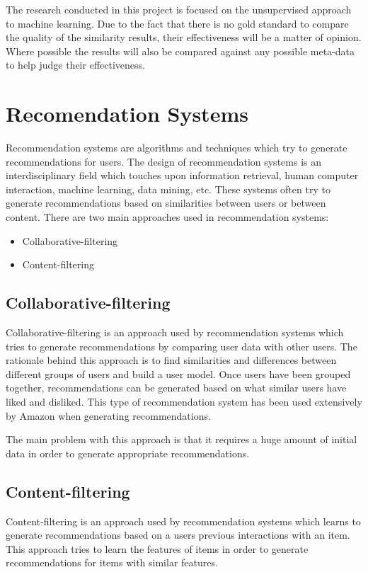 The research conducted in this project is focused on the unsupervised approach to machine learning.
Due to the fact that there is no gold standard to compare the quality of the similarity results, their effectiveness will be a matter of opinion.
Where possible the results will also be compared against any possible meta-data to help judge their effectiveness.

\section{Recomendation Systems}
Recommendation systems are algorithms and techniques which try to generate recommendations for users.
The design of recommendation systems is an interdisciplinary field which touches upon information retrieval, human computer interaction, machine learning, data mining, etc.
These systems often try to generate recommendations based on similarities between users or between content.
There are two main approaches used in recommendation systems:

\begin{itemize}
    \item Collaborative-filtering
    \item Content-filtering
\end{itemize}

\subsection{Collaborative-filtering}
Collaborative-filtering is an approach used by recommendation systems which tries to generate recommendations by comparing user data with other users.
The rationale behind this approach is to find similarities and differences  between different groups of users and build a user model.
Once users have been grouped together, recommendations can be generated based on what similar users have liked and disliked.
This type of recommendation system has been used extensively by Amazon when generating recommendations.

The main problem with this approach is that it requires a huge amount of initial data in order to generate appropriate recommendations.

\subsection{Content-filtering}
Content-filtering is an approach used by recommendation systems which learns to generate recommendations based on a users previous interactions with an item.
This approach tries to learn the features of items in order to generate recommendations for items with similar features.

